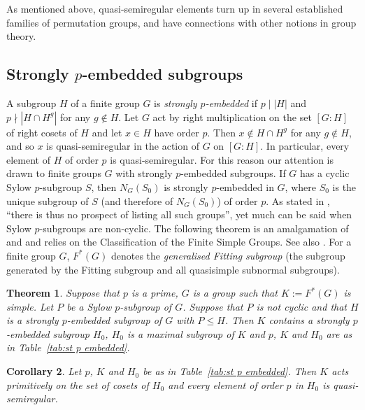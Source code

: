 \documentclass{article}
\newtheorem{thm}{Theorem}[section]
\newtheorem{cor}[thm]{Corollary}
\theoremstyle{remark}
\theoremstyle{definition}
\newcommand{\qsr}{quasi-semiregular}
\newcommand{\qsres}{quasi-semiregular elements}
\begin{document}
As mentioned above, {\qsres} turn up in several established families of permutation groups, and have connections with other notions in group theory. 

\subsection{Strongly $p$-embedded subgroups}

A subgroup $H$ of a finite group $G$ is \emph{strongly $p$-embedded} if $p \mid |H|$ and $p\nmid|H\cap H^g|$ for any $g\notin H$. 
Let $G$ act by right multiplication on the set $[G:H]$ of right cosets of $H$ and let $x\in H$ have order $p$. Then $x \notin H\cap H^g$ for any $g\notin H$, and so $x$ is {\qsr} in the action of $G$ on $[G:H]$. In particular, every element of $H$ of order $p$ is {\qsr}. For this reason our attention is drawn to finite groups $G$ with strongly $p$-embedded subgroups. If $G$  has a  cyclic Sylow $p$-subgroup $S$, then $N_G(S_0)$ is strongly $p$-embedded in $G$, where $S_0$ is the unique subgroup of $S$ (and therefore of $N_G(S_0)$) of order $p$. As stated in \cite[pg.~798]{ParkerStroth}, ``there is thus no prospect of listing all such groups'', yet much can be said when Sylow $p$-subgroups are non-cyclic. 
The following theorem is an amalgamation of \cite[Theorem 7.6.1]{GLS3} and \cite[Theorem 7.6.2]{GLS3} and relies on the Classification of the Finite Simple Groups. See also \cite[Proposition 2.5]{ParkerStroth}. For a finite group $G$, $F^*(G)$ denotes the \emph{generalised Fitting subgroup} (the subgroup generated by the Fitting subgroup and all quasisimple subnormal subgroups).

\begin{thm}
\label{thm: st p embedded}
    Suppose that $p$ is a prime, $G$ is a  group such that $K:=F^*(G)$ is simple. Let $P$ be a Sylow $p$-subgroup of $G$. Suppose that $P$ is not cyclic and that $H$   is  a strongly $p$-embedded subgroup of  $G$ with $P\leqslant H$.
    Then $K$ contains a strongly $p$-embedded subgroup $H_0$, $H_0$ is a maximal subgroup of $K$ and $p$, $K$ and $H_0$ are as in Table~\ref{tab:st p embedded}.
\end{thm}
 

\begin{cor}
    Let $p$,   $K$ and $H_0$ be as in  Table~\ref{tab:st p embedded}. Then  $K$ acts primitively on the set of cosets of $H_0$ and every element of order $p$ in $H_0$ is {\qsr}.
\end{cor}
\end{document}
